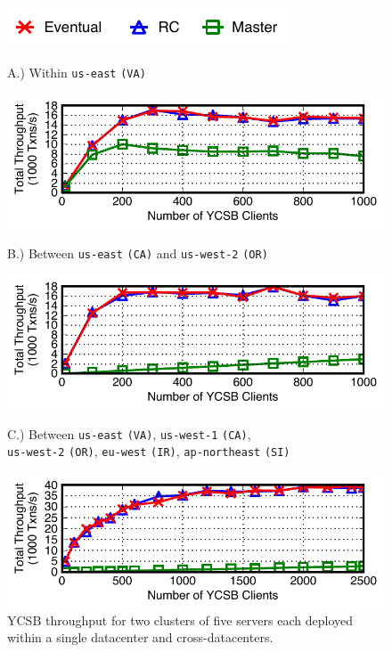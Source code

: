 \begin{figure}[t!]
\begin{center}
\includegraphics[width=.4\columnwidth]{figs/strategylegendthree.pdf}
\begin{center}{A.) Within \texttt{us-east} \texttt{(VA)}}\end{center}
\includegraphics[width=\figscale\columnwidth]{figs/finals/2lan-threads-thru.pdf}
\begin{center}{B.) Between \texttt{us-east} \texttt{(CA)} and \texttt{us-west-2} \texttt{(OR)}}\end{center}
\includegraphics[width=\figscale\columnwidth]{figs/finals/2wan-threads-thru.pdf}
\begin{center}{C.) Between \texttt{us-east} \texttt{(VA)}, \texttt{us-west-1} \texttt{(CA)},\\ \texttt{us-west-2} \texttt{(OR)}, \texttt{eu-west} \texttt{(IR)}, \texttt{ap-northeast} \texttt{(SI)}}\end{center}
\includegraphics[width=\figscale\columnwidth]{figs/finals/5wan-threads-thru.pdf}
\end{center}
\caption{YCSB throughput for two clusters of five servers each 
  deployed within a single datacenter and cross-datacenters.}
\label{fig:wan-thru}
\end{figure}

